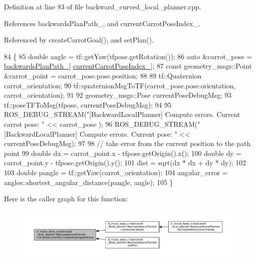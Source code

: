 Definition at line 83 of file backward\+\_\+curved\+\_\+local\+\_\+planner.\+cpp.



References backwards\+Plan\+Path\+\_\+, and current\+Carrot\+Pose\+Index\+\_\+.



Referenced by create\+Carrot\+Goal(), and set\+Plan().


\begin{DoxyCode}
84         \{
85             \textcolor{keywordtype}{double} angle = tf::getYaw(tfpose.getRotation());
86             \textcolor{keyword}{auto} &carrot\_pose = \hyperlink{classcl__move__base__z_1_1backward__local__planner_1_1BackwardLocalPlanner_ad9cde5c85f782cab2ddb4030e3c3f2cf}{backwardsPlanPath\_}[
      \hyperlink{classcl__move__base__z_1_1backward__local__planner_1_1BackwardLocalPlanner_a2e8f2b78bc97f27c5fa431f3af2261ed}{currentCarrotPoseIndex\_}];
87             \textcolor{keyword}{const} geometry\_msgs::Point &carrot\_point = carrot\_pose.pose.position;
88             
89             tf::Quaternion carrot\_orientation;
90             tf::quaternionMsgToTF(carrot\_pose.pose.orientation, carrot\_orientation);
91 
92             geometry\_msgs::Pose currentPoseDebugMsg;
93             tf::poseTFToMsg(tfpose, currentPoseDebugMsg);
94 
95             ROS\_DEBUG\_STREAM(\textcolor{stringliteral}{"[BackwardLocalPlanner] Compute errors. Current carrot pose: "} <<  carrot\_pose
      );
96             ROS\_DEBUG\_STREAM(\textcolor{stringliteral}{"[BackwardLocalPlanner] Compute errors. Current pose: "} <<  
      currentPoseDebugMsg);
97 
98             \textcolor{comment}{// take error from the current position to the path point}
99             \textcolor{keywordtype}{double} dx = carrot\_point.x - tfpose.getOrigin().x();
100             \textcolor{keywordtype}{double} dy = carrot\_point.y - tfpose.getOrigin().y();
101             dist = sqrt(dx * dx + dy * dy);
102 
103             \textcolor{keywordtype}{double} pangle = tf::getYaw(carrot\_orientation);
104             angular\_error = angles::shortest\_angular\_distance(pangle, angle);
105         \}
\end{DoxyCode}
Here is the caller graph for this function\+:
\nopagebreak
\begin{figure}[H]
\begin{center}
\leavevmode
\includegraphics[width=350pt]{classcl__move__base__z_1_1backward__local__planner_1_1BackwardLocalPlanner_a843f030138afe0a28cf11a729fa67383_icgraph}
\end{center}
\end{figure}
